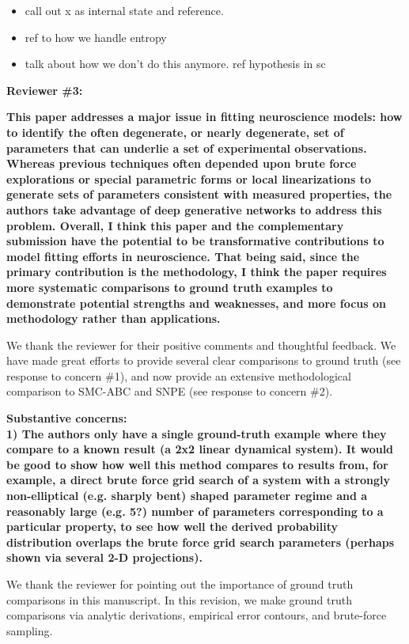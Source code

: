 \documentclass[11pt,a4paper]{article}
\begin{document}
\begin{itemize}
\item call out x as internal state and reference.
\item ref to how we handle entropy
\item talk about how we don't do this anymore.  ref hypothesis in sc
\end{itemize}

{\Large \textbf{Reviewer \#3:}}

\textbf{This paper addresses a major issue in fitting neuroscience models: how to identify the often degenerate, or nearly degenerate, set of parameters that can underlie a set of experimental observations. Whereas previous techniques often depended upon brute force explorations or special parametric forms or local linearizations to generate sets of parameters consistent with measured properties, the authors take advantage of deep generative networks to address this problem. Overall, I think this paper and the complementary submission have the potential to be transformative contributions to model fitting efforts in neuroscience. That being said, since the primary contribution is the methodology, I think the paper requires more systematic comparisons to ground truth examples to demonstrate potential strengths and weaknesses, and more focus on methodology rather than applications. }

We thank the reviewer for their positive comments and thoughtful feedback.
We have made great efforts to provide several clear comparisons to ground truth (see response to concern \#1), and now provide an extensive methodological comparison to SMC-ABC and SNPE (see response to concern \#2).

\textbf{Substantive concerns: \\
1) The authors only have a single ground-truth example where they compare to a known result (a 2x2 linear dynamical system). It would be good to show how well this method compares to results from, for example, a direct brute force grid search of a system with a strongly non-elliptical (e.g. sharply bent) shaped parameter regime and a reasonably large (e.g. 5?) number of parameters corresponding to a particular property, to see how well the derived probability distribution overlaps the brute force grid search parameters (perhaps shown via several 2-D projections). }

We thank the reviewer for pointing out the importance of ground truth comparisons in this manuscript.
In this revision, we make ground truth comparisons via analytic derivations, empirical error contours, and brute-force sampling.
\end{document}
